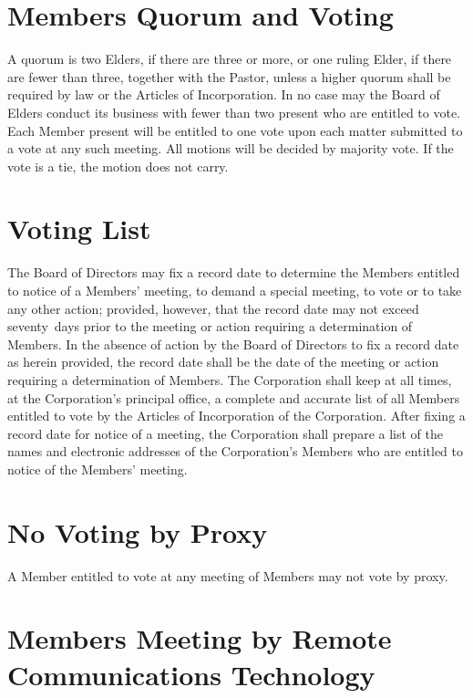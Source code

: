 \documentclass[
]{book}
\begin{document}
\section{Members Quorum and Voting}\label{members-quorum-and-voting}

A quorum is two Elders, if there are three or more, or one ruling
Elder, if there are fewer than three, together with the Pastor, unless
a higher quorum shall be required by law or the Articles of
Incorporation. In no case may the Board of Elders conduct its business
with fewer than two present who are entitled to vote. Each Member
present will be entitled to one vote upon each matter submitted to a
vote at any such meeting. All motions will be decided by majority
vote. If the vote is a tie, the motion does not carry.

\section{Voting List}\label{voting-list}

The Board of Directors may fix a record date to determine the Members
entitled to notice of a Members' meeting, to demand a special meeting,
to vote or to take any other action; provided, however, that the
record date may not exceed seventy~days prior to the meeting or action
requiring a determination of Members. In the absence of action by the
Board of Directors to fix a record date as herein provided, the record
date shall be the date of the meeting or action requiring a
determination of Members. The Corporation shall keep at all times, at
the Corporation's principal office, a complete and accurate list of
all Members entitled to vote by the Articles of Incorporation of the
Corporation. After fixing a record date for notice of a meeting, the
Corporation shall prepare a list of the names and electronic addresses
of the Corporation's Members who are entitled to notice of the
Members' meeting.

\section{No Voting by Proxy}\label{no-voting-by-proxy}

A Member entitled to vote at any meeting of Members may not vote by
proxy.

\section{Members Meeting by Remote Communications Technology}\label{members-meeting-by-remote-communications-technology}
\end{document}

